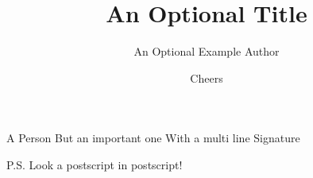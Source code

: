 \documentclass{dragonfly-letter}
\title{An Optional Title}
\author{An Optional Example Author}
\begin{document}
\lipsum[1-7]

\signature{Cheers}{
A Person
But an important one
With a multi line
Signature
}

P.S. Look a postscript in postscript!
\end{document}
